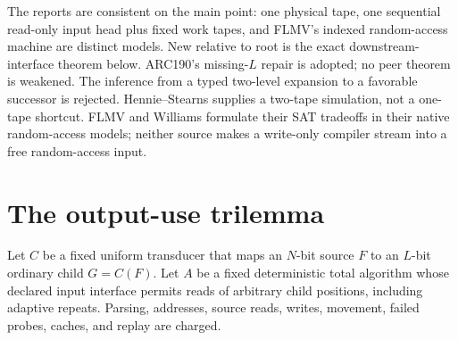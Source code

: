\documentclass[11pt]{article}
\begin{document}
The reports are consistent on the main point: one physical tape, one
sequential read-only input head plus fixed work tapes, and FLMV's indexed
random-access machine are distinct models.  New relative to root is the exact
downstream-interface theorem below.  ARC190's missing-$L$ repair is adopted;
no peer theorem is weakened.  The inference from a typed two-level expansion
to a favorable successor is rejected.  Hennie--Stearns supplies a two-tape
simulation, not a one-tape shortcut.  FLMV and Williams formulate their SAT
tradeoffs in their native random-access models; neither source makes a
write-only compiler stream into a free random-access input.

\section{The output-use trilemma}
Let $C$ be a fixed uniform transducer that maps an $N$-bit source $F$ to an
$L$-bit ordinary child $G=C(F)$.  Let $A$ be a fixed deterministic total
algorithm whose declared input interface permits reads of arbitrary child
positions, including adaptive repeats.  Parsing, addresses, source reads,
writes, movement, failed probes, caches, and replay are charged.
\end{document}
